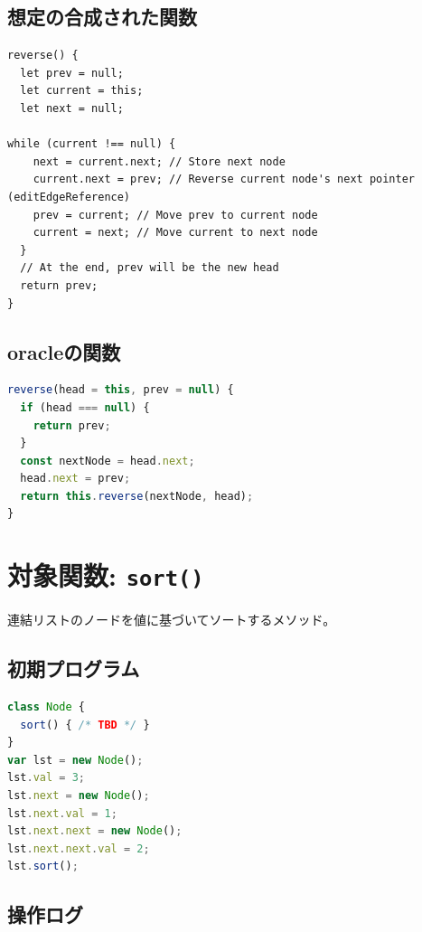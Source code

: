 \documentclass{article}
\begin{document}
\subsection{想定の合成された関数}
\begin{lstlisting}
reverse() {
  let prev = null;
  let current = this;
  let next = null;

while (current !== null) {
    next = current.next; // Store next node
    current.next = prev; // Reverse current node's next pointer (editEdgeReference)
    prev = current; // Move prev to current node
    current = next; // Move current to next node
  }
  // At the end, prev will be the new head
  return prev;
}
\end{lstlisting}

\subsection{oracleの関数}
\begin{lstlisting}[language=JavaScript]
reverse(head = this, prev = null) {
  if (head === null) {
    return prev;
  }
  const nextNode = head.next;
  head.next = prev;
  return this.reverse(nextNode, head);
}
\end{lstlisting}


\section{対象関数: \texttt{sort()}}
連結リストのノードを値に基づいてソートするメソッド。

\subsection{初期プログラム}

\begin{lstlisting}[language=JavaScript]
class Node {
  sort() { /* TBD */ }
}
var lst = new Node(); 
lst.val = 3;
lst.next = new Node();
lst.next.val = 1;
lst.next.next = new Node();
lst.next.next.val = 2;
lst.sort();
\end{lstlisting}

\subsection{操作ログ}
\end{document}
